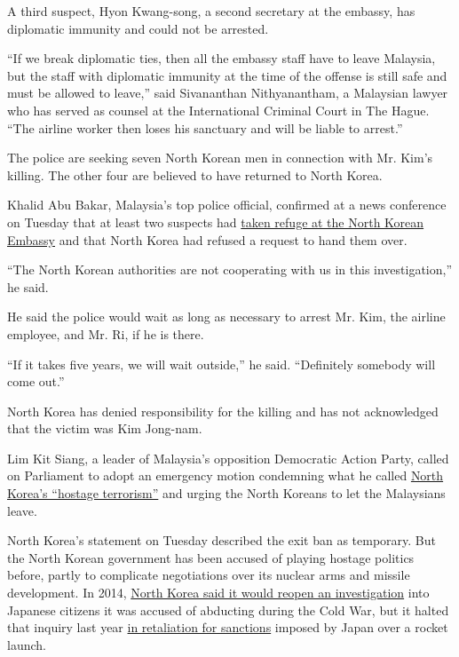A third suspect, Hyon Kwang-song, a second secretary at the embassy, has
diplomatic immunity and could not be arrested.

``If we break diplomatic ties, then all the embassy staff have to leave
Malaysia, but the staff with diplomatic immunity at the time of the
offense is still safe and must be allowed to leave,'' said Sivananthan
Nithyanantham, a Malaysian lawyer who has served as counsel at the
International Criminal Court in The Hague. ``The airline worker then
loses his sanctuary and will be liable to arrest.''

The police are seeking seven North Korean men in connection with Mr.
Kim's killing. The other four are believed to have returned to North
Korea.

Khalid Abu Bakar, Malaysia's top police official, confirmed at a news
conference on Tuesday that at least two suspects had
\href{https://www.nytimes3xbfgragh.onion/2017/03/01/world/asia/malaysia-kim-jong-nam-embassy-immunity.html}{taken
refuge at the North Korean Embassy} and that North Korea had refused a
request to hand them over.

``The North Korean authorities are not cooperating with us in this
investigation,'' he said.

He said the police would wait as long as necessary to arrest Mr. Kim,
the airline employee, and Mr. Ri, if he is there.

``If it takes five years, we will wait outside,'' he said. ``Definitely
somebody will come out.''

North Korea has denied responsibility for the killing and has not
acknowledged that the victim was Kim Jong-nam.

Lim Kit Siang, a leader of Malaysia's opposition Democratic Action
Party, called on Parliament to adopt an emergency motion condemning what
he called
\href{https://blog.limkitsiang.com/2017/03/07/parliament-should-adopt-an-all-party-emergency-motion-tomorrow-to-condemn-north-koreas-hostage-terrorism-and-to-call-on-north-korea-regime-to-immediately-revoke-the-ban-on-m/\#more-36730}{North
Korea's ``hostage terrorism''} and urging the North Koreans to let the
Malaysians leave.

North Korea's statement on Tuesday described the exit ban as temporary.
But the North Korean government has been accused of playing hostage
politics before, partly to complicate negotiations over its nuclear arms
and missile development. In 2014,
\href{https://www.nytimes3xbfgragh.onion/2014/05/30/world/asia/north-korea-agrees-to-investigate-fate-of-japanese-abducted-decades-ago.html}{North
Korea said it would reopen an investigation} into Japanese citizens it
was accused of abducting during the Cold War, but it halted that inquiry
last year
\href{https://www.nytimes3xbfgragh.onion/2016/02/14/world/asia/north-korea-japan-abductions.html}{in
retaliation for sanctions} imposed by Japan over a rocket launch.

